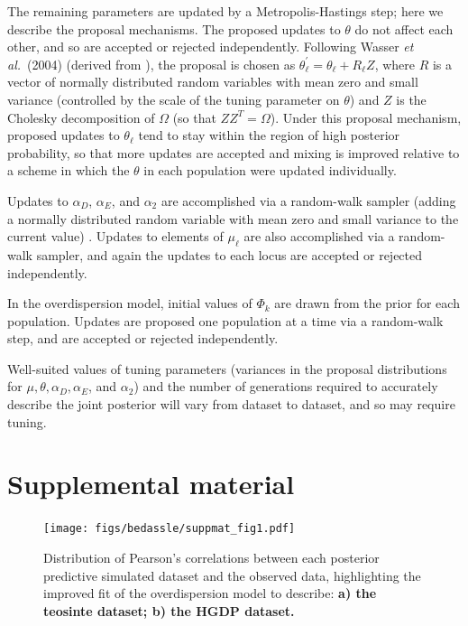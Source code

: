The remaining parameters are updated by a Metropolis-Hastings step;
here we describe the proposal mechanisms.
The proposed updates to $\theta$ do not affect each other, and so are accepted or rejected independently.  Following Wasser \textit{et al.}~(2004) (derived from \citep{ChristensenWaagepetersen2002, Moller1998}), the proposal is chosen as $\theta_{\ell}^{'} = \theta_{\ell} +  R_{\ell}Z$, where $R$ is a vector of normally distributed random variables with mean zero and small variance (controlled by the scale of the tuning parameter on $\theta$) and $Z$ is the Cholesky decomposition of $\Omega$ (so that $ZZ^{T} = \Omega$).  Under this proposal mechanism, proposed updates to $\theta_{\ell}$ tend to stay within the region of high posterior probability, so that more updates are accepted and mixing is improved relative to a scheme in which the $\theta$ in each population were updated individually.  

Updates to $\alpha_{D}$, $\alpha_{E}$, and $\alpha_{2}$ are accomplished via a random-walk sampler (adding a normally distributed random variable with mean zero and small variance to the current value) \citep{Gilks1996}.  Updates to elements of $\mu_{\ell}$ are also accomplished via a random-walk sampler, and again the updates to each locus are accepted or rejected independently.  

In the overdispersion model, initial values of $\Phi_{k}$ are drawn from the prior for each population.  Updates are proposed one population at a time via a random-walk step, and are accepted or rejected independently.  

Well-suited values of tuning parameters (variances in the proposal distributions for $\mu,\theta,\alpha_{D},\alpha_{E}$, and $\alpha_{2}$)
and the number of generations required to accurately describe the joint posterior will vary from dataset to dataset, and so may require tuning.

%



\clearpage

\section*{Supplemental material}
\renewcommand{\thefigure}{S\arabic{figure}}
\setcounter{figure}{0}
\renewcommand{\thetable}{S\arabic{table}}
\setcounter{table}{0}

\begin{figure}[ht!]
\begin{center}
  \texttt{[image: figs/bedassle/suppmat\_fig1.pdf]}
 \caption{
 		\textmd{Distribution of Pearson's correlations between each posterior predictive simulated dataset and the observed data, highlighting the improved fit of the overdispersion model to describe:}
	\bf{a)}
 		\textmd{the teosinte dataset;}
	\bf{b)}
 		\textmd{the HGDP dataset.}
 \label{sfig:pps.corr}
  }
\end{center}
\end{figure}

